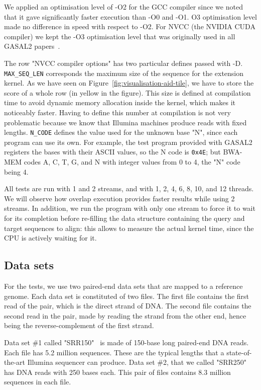 We applied an optimisation level of -O2 for the GCC compiler since we noted that it gave significantly faster execution than -O0 and -O1. O3 optimisation level made no difference in speed with respect to -O2. For NVCC (the NVIDIA CUDA compiler) we kept the -O3 optimisation level that was originally used in all GASAL2 papers~\cite{Ahmed:gasal}.

The row "NVCC compiler options" has two particular defines passed with -D. \verb|MAX_SEQ_LEN| corresponds the maximum size of the sequence for the extension kernel. As we have seen on Figure~\ref{fig:visualisation-aid-tile}, we have to store the score of a whole row (in yellow in the figure). This size is defined at compilation time to avoid dynamic memory allocation inside the kernel, which makes it noticeably faster. Having to define this number at compilation is not very problematic because we know that Illumina machines produce reads with fixed lengths. \verb|N_CODE| defines the value used for the unknown base "N", since each program can use its own. For example, the test program provided with GASAL2 registers the bases with their ASCII values, so the N code is \verb|0x4E|; but BWA-MEM codes A, C, T, G, and N with integer values from 0 to 4, the "N" code being 4.

All tests are run with 1 and 2 streams, and with 1, 2, 4, 6, 8, 10, and 12 threads. We will observe how overlap execution provides faster results while using 2 streams. In addition, we run the program with only one stream to force it to wait for its completion before re-filling the data structure containing the query and target sequences to align: this allows to measure the actual kernel time, since the CPU is actively waiting for it. 

\subsection{Data sets}

For the tests, we use two paired-end data sets that are mapped to a reference genome. Each data set is constituted of two files. The first file contains the first read of the pair, which is the direct strand of DNA. The second file contains the second read in the pair, made by reading the strand from the other end, hence being the reverse-complement of the first strand.

Data set \#1 called "SRR150"~\cite{ncbi:srr150} is made of 150-base long paired-end DNA reads. Each file has 5.2 million sequences. These are the typical lengths that a state-of-the-art Illumina sequencer can produce. Data set \#2, that we called "SRR250"~\cite{ncbi:srr250} has DNA reads with 250 bases each. This pair of files contains 8.3 million sequences in each file.


